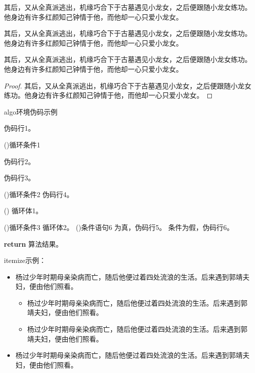\documentclass[doctor, vlined]{DissertUESTC}
\begin{document}
	\begin{lemma}[名称]
		其后，又从全真派逃出，机缘巧合下于古墓遇见小龙女，之后便跟随小龙女练功。他身边有许多红颜知己钟情于他，而他却一心只爱小龙女。
	\end{lemma}

	\begin{example}[名称]
		其后，又从全真派逃出，机缘巧合下于古墓遇见小龙女，之后便跟随小龙女练功。他身边有许多红颜知己钟情于他，而他却一心只爱小龙女。
	\end{example}

	\begin{assumption}[名称]
		其后，又从全真派逃出，机缘巧合下于古墓遇见小龙女，之后便跟随小龙女练功。他身边有许多红颜知己钟情于他，而他却一心只爱小龙女。
	\end{assumption}
	
	\begin{proof}
		其后，又从全真派逃出，机缘巧合下于古墓遇见小龙女，之后便跟随小龙女练功。他身边有许多红颜知己钟情于他，而他却一心只爱小龙女。
	\end{proof}
	

	\begin{algo}[!h]
		\caption{algo环境伪码示例}

		伪码行1。
		
		\For(){循环条件1}{
			伪码行2。
			
			伪码行3。
			
			\DoWhile(){循环条件2}{
				伪码行4。
			}
			
			\Loop(){
				循环体1。
			}
			
			\Repeat(){循环条件3}{
				循环体2。
			}
			\eIf(){条件语句6}{
				为真，伪码行5。
			}{
				条件为假，伪码行6。
			}
		}
		\textbf{return} 算法结果。
	\end{algo}
	

	itemize示例：

	\begin{itemize}
		\item 杨过少年时期母亲染病而亡，随后他便过着四处流浪的生活。后来遇到郭靖夫妇，便由他们照看。
		\begin{itemize}
			\item 杨过少年时期母亲染病而亡，随后他便过着四处流浪的生活。后来遇到郭靖夫妇，便由他们照看。
			\item 杨过少年时期母亲染病而亡，随后他便过着四处流浪的生活。后来遇到郭靖夫妇，便由他们照看。
		\end{itemize}
		\item 杨过少年时期母亲染病而亡，随后他便过着四处流浪的生活。后来遇到郭靖夫妇，便由他们照看。
	\end{itemize}
\end{document}

